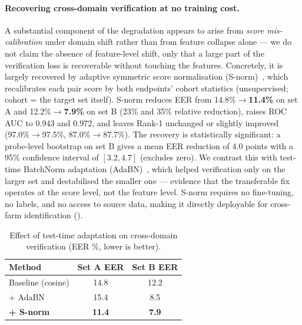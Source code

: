 \documentclass[11pt]{article}
\begin{document}
\paragraph{Recovering cross-domain verification at no training cost.}
A substantial component of the degradation appears to arise from \emph{score mis-calibration}
under domain shift rather than from feature collapse alone --- we do not claim the absence of
feature-level shift, only that a large part of the verification loss is recoverable without
touching the features. Concretely, it is largely recovered by adaptive symmetric score
normalisation (S-norm)~\cite{snorm}, which
recalibrates each pair score by both endpoints' cohort statistics (unsupervised; cohort =
the target set itself). S-norm reduces EER from 14.8\%$\to$\textbf{11.4\%} on set A and
12.2\%$\to$\textbf{7.9\%} on set B (23\% and 35\% relative reduction), raises ROC AUC to
0.943 and 0.972, and leaves Rank-1 unchanged or slightly improved (97.0\%$\to$97.5\%,
87.0\%$\to$87.7\%). The recovery is statistically significant: a probe-level bootstrap on
set B gives a mean EER reduction of 4.0 points with a 95\% confidence interval of
$[3.2, 4.7]$ (excludes zero). We contrast this with test-time BatchNorm adaptation (AdaBN)~\cite{adabn},
which helped verification only on the larger set and destabilised the smaller one ---
evidence that the transferable fix operates at the score level, not the feature level.
S-norm requires no fine-tuning, no labels, and no access to source data, making it directly
deployable for cross-farm identification ().

\begin{table}[t]
  \centering
  \caption{Effect of test-time adaptation on cross-domain verification (EER \%, lower is
  better).}
  \label{tab:snorm}
  \small
  \begin{tabular}{lcc}
    \toprule
    Method & Set A EER & Set B EER \\
    \midrule
    Baseline (cosine) & 14.8 & 12.2 \\
    + AdaBN & 15.4 & 8.5 \\
    \textbf{+ S-norm} & \textbf{11.4} & \textbf{7.9} \\
    \bottomrule
  \end{tabular}
\end{table}
\end{document}
